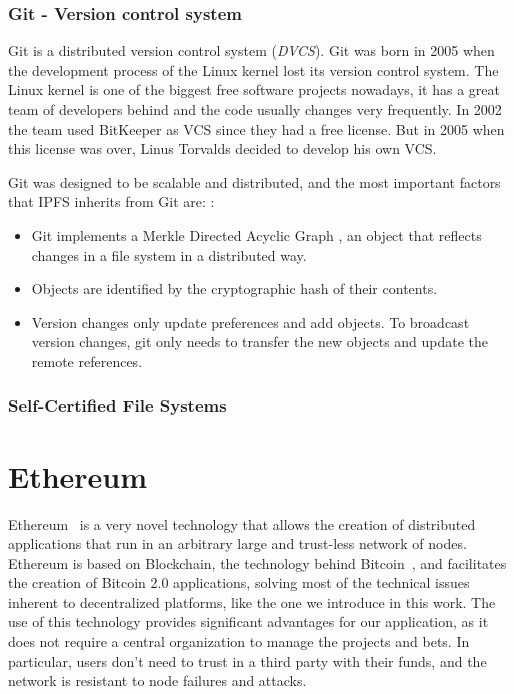\subsubsection{Git - Version control system}
Git is a distributed version control system (\emph{DVCS})\cite{torvalds2010git}.
Git was born in 2005 when the development process of the Linux kernel lost its
version control system. The Linux kernel is one of the biggest free software
projects nowadays, it has a great team of developers behind and the code usually
changes very frequently. In 2002 the team used BitKeeper as VCS since they had a
free license. But in 2005 when this license was over, Linus Torvalds decided to
develop his own VCS\cite{spinellis2005version}.

Git was designed to be scalable and distributed, and the most important factors
that IPFS inherits from Git are: \cite{benet2014ipfs}:

\begin{itemize}
\item Git implements a Merkle Directed Acyclic Graph
  \cite{bleichenbacher1994directed}, an object that reflects changes in a file
  system in a distributed way.
\item Objects are identified by the cryptographic hash of their contents.
\item Version changes only update preferences and add objects. To broadcast
  version changes, git only needs to transfer the new objects and update the
  remote references.
\end{itemize}

\subsubsection{Self-Certified File Systems}


\section{Ethereum}


Ethereum~\cite{buterin2014ethereum} is a very novel technology that allows the
creation of distributed applications that run in an arbitrary large and
trust-less network of nodes. Ethereum is based on
Blockchain, the technology behind Bitcoin~\cite{nakamoto2008bitcoin}, and
facilitates the creation of Bitcoin 2.0 applications, solving most of the
technical issues inherent to decentralized platforms, like the one we introduce
in this work. The use of this technology provides significant advantages for our
application, as it does not require a central organization to manage the
projects and bets. In particular, users don’t need to trust in a third party
with their funds, and the network is resistant to node failures and attacks.

